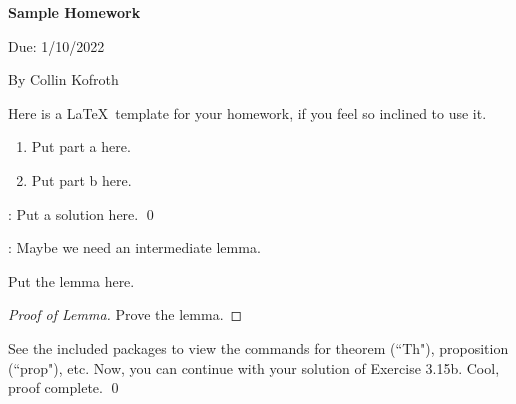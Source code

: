 \documentclass[12pt]{article}
\begin{document}
\begin{center}
{\bf Sample Homework}
\end{center}
\centerline{Due: 1/10/2022} 
\begin{center}
{By Collin Kofroth}
\end{center}

Here is a \LaTeX\ template for your homework, if you feel so inclined to use it.

\begin{enumerate}[label=(\alph*)]
    \item Put part a here.
    \item Put part b here. 
\end{enumerate} 

: Put a solution here. \qed

: Maybe we need an intermediate lemma.
\begin{lem}
Put the lemma here.
\end{lem}
\begin{proof}[Proof of Lemma]
Prove the lemma.
\end{proof}
See the included packages to view the commands for theorem (``Th"), proposition (``prop"), etc. Now, you can continue with your solution of Exercise 3.15b. Cool, proof complete. \qed 
\end{document}
